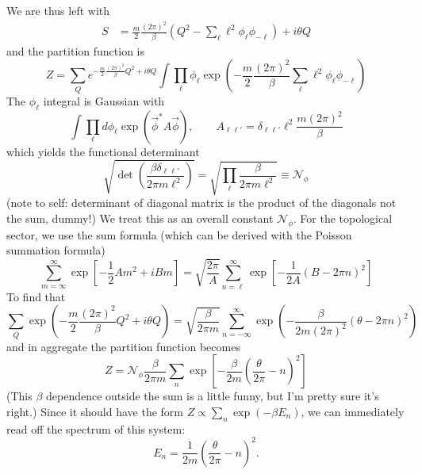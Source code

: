 \documentclass{report}
\begin{document}
We are thus left with 
\begin{align*}
	S &=  \frac{m}{2}\frac{(2\pi)^2}{\beta}
				\left(
					Q^2 - \sum_{\ell}\ell^2 \phi_\ell \phi_{-\ell}
							\right)
					 + i\theta Q
\end{align*}
and the partition function is 
\begin{equation}\label{eq:particle-on-ring-partition-topological}
	Z = \sum_Q 
		e^{-\frac{m}{2} \frac{(2\pi)^2}{\beta}Q^2 + i\theta Q}
		\int \prod_\ell \phi_\ell \exp\left(
			-\frac{m}{2}\frac{(2\pi)^2}{\beta}\sum_\ell \ell^2 
				\phi_\ell \phi_{-\ell}
		\right)
\end{equation}
The $ \phi_\ell $ integral is Gaussian with 
\begin{equation*}
	\int \prod_\ell d\phi_\ell \exp\left(\vec{\phi}^\ast A \vec{\phi}\right),
	\qquad A_{\ell\ell'} = \delta_{\ell\ell'}\ell^2 \frac{m(2\pi)^2}{\beta}
\end{equation*}
which yields the functional determinant 
\begin{equation*}
	\sqrt{\det\left( \frac{\beta \delta_{\ell\ell'}}{2\pi m\ell^2}\right)}
	= \sqrt{\prod_\ell \frac{\beta}{2\pi m\ell^2}} \equiv  \mathcal{N}_\phi
\end{equation*}
(note to self: determinant of diagonal matrix is the product of the diagonals 
not the sum, dummy!) We treat this as an overall constant $ \mathcal{N}_\phi $.
For the topological sector, we use the sum formula (which can be derived 
with the Poisson summation formula)
\begin{equation*}
	\sum_{m = \infty}^{\infty} 
		\exp\left[- \frac{1}{2}Am^2 + iB m\right]
			= \sqrt{\frac{2\pi}{A}}
				\sum_{n = \ell}^{\infty} 
				\exp\left[-\frac{1}{2A} (B - 2\pi n)^2\right]
\end{equation*}
To find that 
\begin{equation*}
	\sum_Q 
		\exp \left(-\frac{m}{2} \frac{(2\pi)^2}{\beta}Q^2 + i\theta Q\right)
		= \sqrt{\frac{\beta}{2\pi m}} \sum_{n=-\infty}^{\infty}
			\exp\left(-\frac{\beta}{2m(2\pi)^2} (\theta - 2\pi n)^2\right)
\end{equation*}
and in aggregate the partition function becomes 
\begin{equation*}
	Z =  \mathcal{N}_\phi \frac{\beta}{2\pi m}\sum_n \exp \left[
		- \frac{\beta}{2m}\left(\frac{\theta}{2\pi} - n\right)^2
	\right]
\end{equation*}
(This $ \beta $ dependence outside the sum is a little funny, but I'm pretty 
sure it's right.)
Since it should have the form $ Z \propto \sum_n \exp(-\beta E_n) $, we can 
immediately read off the spectrum of this system:
\begin{equation*}
	E_n = \frac{1}{2m}\left(\frac{\theta}{2\pi} - n\right)^2.
\end{equation*}
\end{document}
